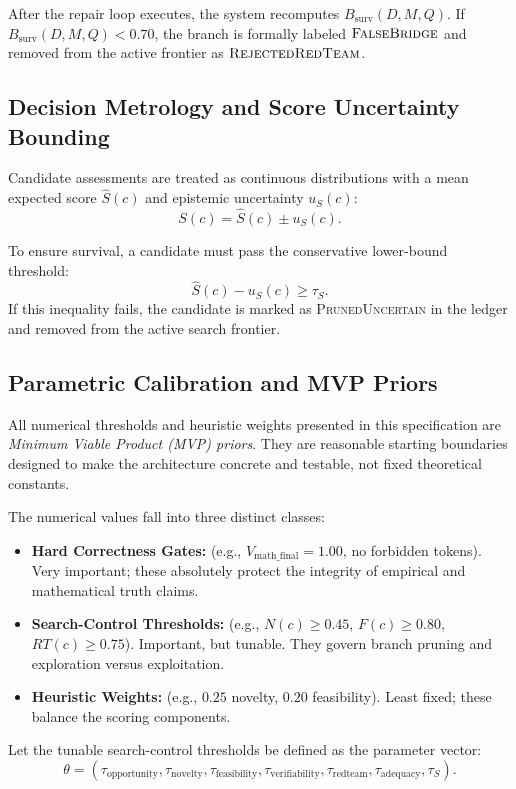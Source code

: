 \documentclass[11pt]{article}
\begin{document}
After the repair loop executes, the system recomputes $B_{\text{surv}}(D,M,Q)$. If $B_{\text{surv}}(D,M,Q) < 0.70$, the branch is formally labeled $\textsc{FalseBridge}$ and removed from the active frontier as $\textsc{RejectedRedTeam}$.

\subsection{Decision Metrology and Score Uncertainty Bounding}

Candidate assessments are treated as continuous distributions with a mean expected score $\hat{S}(c)$ and epistemic uncertainty $u_S(c)$:
$$
S(c) = \hat{S}(c) \pm u_S(c).
$$

To ensure survival, a candidate must pass the conservative lower-bound threshold:
$$
\hat{S}(c) - u_S(c) \geq \tau_S.
$$
If this inequality fails, the candidate is marked as \textsc{PrunedUncertain} in the ledger and removed from the active search frontier.

\subsection{Parametric Calibration and MVP Priors}

All numerical thresholds and heuristic weights presented in this specification are \textit{Minimum Viable Product (MVP) priors}. They are reasonable starting boundaries designed to make the architecture concrete and testable, not fixed theoretical constants. 

The numerical values fall into three distinct classes:
\begin{itemize}[leftmargin=*]
    \item \textbf{Hard Correctness Gates:} (e.g., $V_{\text{math\_final}} = 1.00$, no forbidden tokens). Very important; these absolutely protect the integrity of empirical and mathematical truth claims.
    \item \textbf{Search-Control Thresholds:} (e.g., $N(c) \geq 0.45$, $F(c) \geq 0.80$, $RT(c) \geq 0.75$). Important, but tunable. They govern branch pruning and exploration versus exploitation.
    \item \textbf{Heuristic Weights:} (e.g., $0.25$ novelty, $0.20$ feasibility). Least fixed; these balance the scoring components.
\end{itemize}

Let the tunable search-control thresholds be defined as the parameter vector:
$$
\theta = (\tau_{\text{opportunity}}, \tau_{\text{novelty}}, \tau_{\text{feasibility}}, \tau_{\text{verifiability}}, \tau_{\text{redteam}}, \tau_{\text{adequacy}}, \tau_S).
$$
\end{document}
